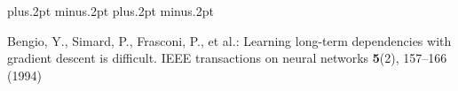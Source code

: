 \documentclass[twoside]{article}
\begin{document}
\begin{multicols}{2}
%


\begin{thebibliography}{99}
\footnotesize
\itemsep=-3pt plus.2pt minus.2pt
\baselineskip=13pt plus.2pt minus.2pt

Bengio, Y., Simard, P., Frasconi, P., et al.: Learning long-term dependencies with gradient descent is difficult. IEEE transactions on neural networks \textbf{5}(2), 157--166 (1994)


\end{thebibliography}
\end{multicols}
\end{document}
